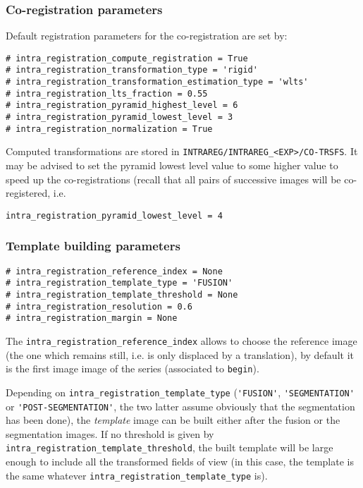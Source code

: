 \subsubsection{Co-registration parameters}
\label{sec:cli:intraregistration:coregistration}
Default registration parameters for the co-registration are set by:
\begin{verbatim}
# intra_registration_compute_registration = True
# intra_registration_transformation_type = 'rigid'
# intra_registration_transformation_estimation_type = 'wlts'
# intra_registration_lts_fraction = 0.55
# intra_registration_pyramid_highest_level = 6
# intra_registration_pyramid_lowest_level = 3
# intra_registration_normalization = True
\end{verbatim}
Computed transformations are stored in \verb|INTRAREG/INTRAREG_<EXP>/CO-TRSFS|.
It may be advised to set the pyramid lowest level value to some higher value to speed up the co-registrations (recall that all pairs of successive images will be co-registered, i.e.
\begin{verbatim}
intra_registration_pyramid_lowest_level = 4
\end{verbatim}


\subsubsection{Template building parameters}
\label{sec:cli:intraregistration:template}

\begin{verbatim}
# intra_registration_reference_index = None
# intra_registration_template_type = 'FUSION'
# intra_registration_template_threshold = None
# intra_registration_resolution = 0.6
# intra_registration_margin = None
\end{verbatim}

The \verb|intra_registration_reference_index| allows to choose the reference image (the one which remains still, i.e. is only displaced by a translation), by default it is the first image image of the series (associated to \verb|begin|).

Depending on \verb|intra_registration_template_type| (\verb|'FUSION'|, \verb|'SEGMENTATION'| or \verb|'POST-SEGMENTATION'|, the two latter assume obviously that the segmentation has been done), the \textit{template} image can be built either after the fusion or the segmentation images. If no threshold is given by \verb|intra_registration_template_threshold|, the built template will be large enough to include all the transformed fields of view (in this case, the template is the same whatever \verb|intra_registration_template_type| is). 

